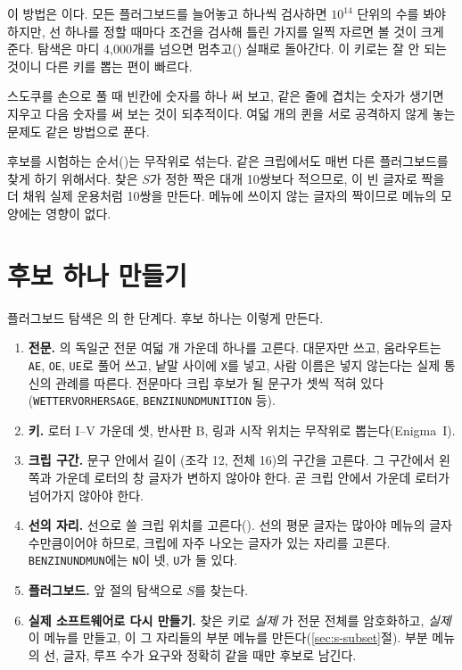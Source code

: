 \Why 이 방법은 이다. 모든 플러그보드를 늘어놓고 하나씩 검사하면 $10^{14}$ 단위의 수를 봐야
하지만, 선 하나를 정할 때마다 조건을 검사해 틀린 가지를 일찍 자르면 볼 것이 크게 준다. 탐색은 마디 4,000개를 넘으면
멈추고() 실패로 돌아간다. 이 키로는 잘 안 되는 것이니 다른 키를 뽑는 편이 빠르다.

\General 스도쿠를 손으로 풀 때 빈칸에 숫자를 하나 써 보고, 같은 줄에 겹치는 숫자가 생기면 지우고 다음 숫자를 써 보는
것이 되추적이다. 여덟 개의 퀸을 서로 공격하지 않게 놓는 문제도 같은 방법으로 푼다.

\Ours 후보를 시험하는 순서()는 무작위로 섞는다. 같은 크립에서도 매번 다른 플러그보드를 찾게 하기 위해서다.
찾은 $S$가 정한 짝은 대개 10쌍보다 적으므로, 이 빈 글자로 짝을 더 채워 실제 운용처럼 10쌍을
만든다. 메뉴에 쓰이지 않는 글자의 짝이므로 메뉴의 모양에는 영향이 없다.

\section{후보 하나 만들기}\label{sec:mc-candidate}

플러그보드 탐색은 의 한 단계다. 후보 하나는 이렇게 만든다.

\begin{enumerate}
\item \textbf{전문.} 의 독일군 전문 여덟 개 가운데 하나를 고른다. 대문자만 쓰고, 움라우트는
\texttt{AE}, \texttt{OE}, \texttt{UE}로 풀어 쓰고, 낱말 사이에 \texttt{X}를 넣고, 사람 이름은 넣지 않는다는 실제 통신의
관례를 따른다. 전문마다 크립 후보가 될 문구가 셋씩 적혀 있다(\texttt{WETTERVORHERSAGE}, \texttt{BENZINUNDMUNITION} 등).
\item \textbf{키.} 로터 I--V 가운데 셋, 반사판 B, 링과 시작 위치는 무작위로 뽑는다(Enigma~I).
\item \textbf{크립 구간.} 문구 안에서 길이 (조각 12, 전체 16)의 구간을 고른다. 그 구간에서 왼쪽과
가운데 로터의 창 글자가 변하지 않아야 한다. 곧 크립 안에서 가운데 로터가 넘어가지 않아야 한다.
\item \textbf{선의 자리.} 선으로 쓸 크립 위치를 고른다(). 선의 평문 글자는 많아야 메뉴의 글자
수만큼이어야 하므로, 크립에 자주 나오는 글자가 있는 자리를 고른다. \texttt{BENZINUNDMUN}에는 \texttt{N}이 넷,
\texttt{U}가 둘 있다.
\item \textbf{플러그보드.} 앞 절의 탐색으로 $S$를 찾는다.
\item \textbf{실제 소프트웨어로 다시 만들기.} 찾은 키로 \emph{실제} 가 전문 전체를 암호화하고, \emph{실제}
이 메뉴를 만들고, 이 그 자리들의 부분 메뉴를 만든다(\ref{sec:s-subset}절). 부분 메뉴의
선, 글자, 루프 수가 요구와 정확히 같을 때만 후보로 남긴다.
\end{enumerate}

